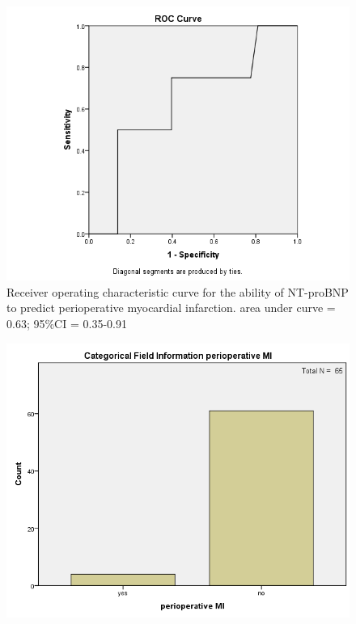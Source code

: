 \documentclass[14pt,a4paper,onecolumn]{extarticle}
\begin{document}
\clearpage
\begin{figure}
    \centering
    \includegraphics[scale=0.7]{../images/roc_mi.png}
    \small\caption{Receiver operating characteristic curve for the ability of NT-proBNP to predict perioperative myocardial infarction.  area under curve = 0.63; 95\%CI = 0.35-0.91}
    \label{}
\end{figure}

\clearpage
\begin{figure}
    \centering
    \includegraphics[scale=0.7]{../images/cat_mi.png}
    \small\caption{}
    \label{}
\end{figure}
\end{document}
